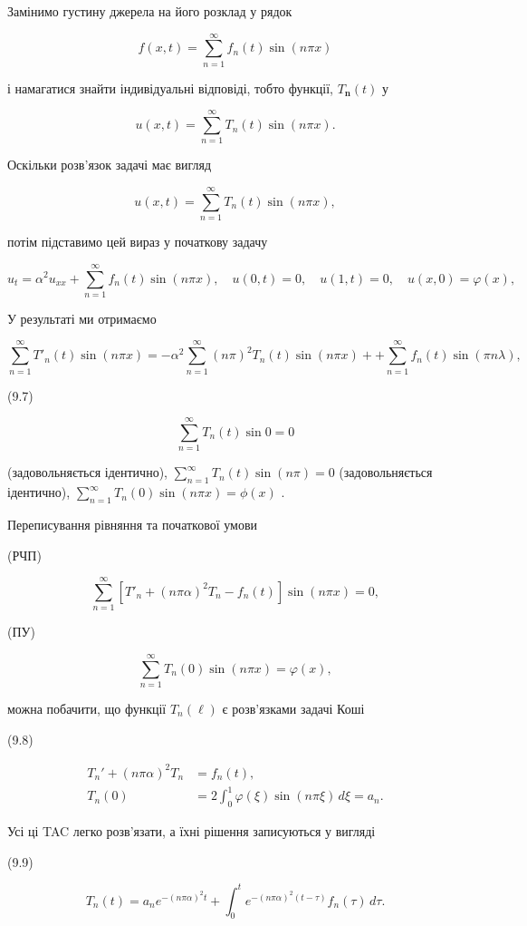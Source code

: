 \documentclass[
  ukrainian,
]{article}
\begin{document}
Замінимо густину джерела на його розклад у рядок

\[f(x, t) = \sum_{n=1}^{\infty} f_n(t) \sin(n\pi x)\]

і намагатися знайти індивідуальні відповіді, тобто функції,
\(T_{\mathbf{n}}(t)\) у

\[u(x, t) = \sum_{n=1}^{\infty} T_n(t) \sin(n\pi x).\]

Оскільки розв'язок задачі має вигляд

\[u(x, t) = \sum_{n=1}^{\infty} T_n(t) \sin(n\pi x),\]

потім підставимо цей вираз у початкову задачу

\[
u_{t} = \alpha^{2} u_{xx} + \sum_{n=1}^{\infty} f_{n}(t) \sin(n\pi x),
\quad u(0, t) = 0, \quad u(1, t) = 0, \quad u(x, 0) = \varphi(x),
\]

У результаті ми отримаємо

\[
\sum_{n=1}^{\infty} T'_n(t) \sin(n\pi x) = -\alpha^2 \sum_{n=1}^{\infty} (n\pi)^2 T_n(t) \sin(n\pi x) + + \sum_{n=1}^{\infty} f_n(t) \sin(\pi n\lambda),
\]

(9.7)

\[
\sum_{n=1}^{\infty} T_n(t) \sin 0 = 0
\]

(задовольняється ідентично),
\(\sum_{n=1}^{\infty} T_n(t) \sin (n\pi) = 0\) (задовольняється
ідентично), \(\sum_{n=1}^{\infty} T_n(0) \sin (n\pi x) = \phi(x)\) .

Переписування рівняння та початкової умови

(РЧП)

\[
\sum_{n=1}^{\infty} [T'_n + (n\pi\alpha)^2 T_n - f_n(t)] \sin(n\pi x) = 0,
\]

(ПУ)

\[
\sum_{n=1}^{\infty} T_n(0) \sin(n\pi x) = \varphi(x),
\]

можна побачити, що функції \(T_n(\ell)\) є розв'язками задачі Коші

(9.8)

\[
\begin{aligned}
T_n' + (n\pi\alpha)^2 T_n &= f_n(t), \\
T_n(0) &= 2 \int_0^1 \varphi(\xi)\sin(n\pi \xi)\,d\xi = a_n.
\end{aligned}
\]

Усі ці TAC легко розв'язати, а їхні рішення записуються у вигляді

(9.9)

\[
T_n(t) = a_n e^{-(n\pi\alpha)^2 t} + \int_0^t e^{-(n\pi\alpha)^2 (t-\tau)} f_n(\tau)\,d\tau.
\]
\end{document}
